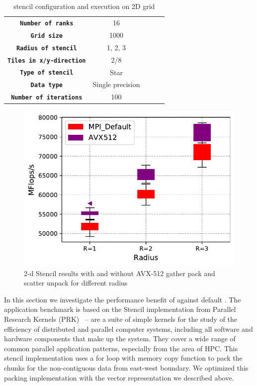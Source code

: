 \documentclass[conference]{IEEEtran}
\begin{document}
\begin{table}[h]
  \centering
  \caption{\mpi stencil configuration and execution on 2D grid}\label{tab:ewconfig}
  \label{tab:parameters1}
  \small
  \begin{tabular}{cclll}
    \toprule
    \midrule
      \texttt{\bf Number of ranks} & 16 \\
      \texttt{\bf Grid size} & 1000 \\
      \texttt{\bf Radius of stencil} & 1, 2, 3 \\
      \texttt{\bf Tiles in x/y-direction} & 2/8 \\
      \texttt{\bf Type of stencil} & Star \\
      \texttt{\bf Data type} & Single precision \\
      \texttt{\bf Number of iterations} & 100 \\
      \bottomrule
  \end{tabular}
\end{table}

\begin{figure}[h]
    \centering
    \includegraphics[width=\linewidth]{stencil_diff_radius.pdf}
    \caption{2-d Stencil results with and without AVX-512 gather pack and scatter unpack for different radius}
    \label{fig:stencil_diff_radius}
\end{figure}

In this section we investigate the performance benefit of \ourwork against default \ompi.
The application benchmark is based on the Stencil \mpi implementation from Parallel
Research Kernels (PRK)~\cite{mpistencil,PRK2014} -- are a suite of simple kernels for the study of the efficiency
of distributed and parallel computer systems, including all software and hardware components that make up the system.
They cover a wide range of common parallel application patterns, especially from the area of HPC.
This stencil implementation uses a for loop with memory copy function to pack the chunks for the non-contiguous data from east-west boundary.
We optimized this packing implementation with the vector representation we described above.
\end{document}
